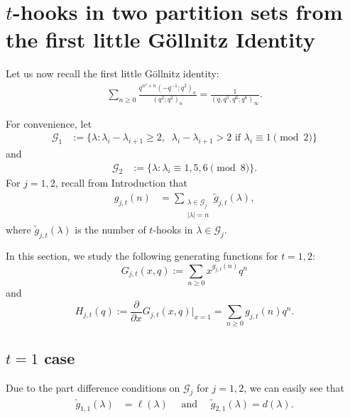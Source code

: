 \documentclass[11pt,reqno]{amsart}
\theoremstyle{remark}
\numberwithin{equation}{section}
\begin{document}
\section{$t$-hooks in two partition sets from the first little G\"{o}llnitz Identity}\label{sec5}

Let us now recall the first little G\"ollnitz identity:
\begin{align*}
	\sum_{n\ge 0} \frac{ q^{n^2+n} (-q^{-1};q^2)_n}{(q^2;q^2)_n} =\frac{1}{(q,q^5,q^6;q^{8})_{\infty}}.
\end{align*}   

For convenience, let
\begin{align*}
	\mathcal{G}_1&:=\{\lambda : \lambda_{i}-\lambda_{i+1} \ge 2, \;\; \lambda_{i}-\lambda_{i+1} >2 \text{ if $\lambda_i\equiv 1 \pmod{2}$}\}
\end{align*}
and
\begin{align*}
	\mathcal{G}_2&:=\{\lambda : \lambda_{i}\equiv 1, 5, 6 \pmod{8}\}.
\end{align*} 
For $j=1,2$, recall from Introduction that
\begin{align*}
	g_{j,t}(n)&=\sum\limits_{\substack{\lambda\in\mathcal{G}_j \\ |\lambda|=n}}\widetilde{g}_{j,t} (\lambda),
\end{align*}
where $\widetilde{g}_{j, t} (\lambda)$ is the number of $t$-hooks in $\lambda \in \mathcal{G}_j$. 

In this section, we study the following generating functions for $t=1,2$:
\begin{equation*}
	G_{j,t}(x,q):=\sum_{n\ge 0} x^{g_{j,t}(n)} q^{n}
\end{equation*}
and
\begin{equation*}
	H_{j,t}(q):=\frac{\partial}{\partial x} G_{j,t}(x,q) \bigg|_{x=1}=\sum_{n\ge 0} g_{j,t}(n) q^n. 
\end{equation*}


\subsection{$t=1$ case}\label{sec5.1}
Due to the part difference conditions on $\mathcal{G}_j$ for $j=1,2$, we can easily see that
\begin{align*}
	\widetilde{g}_{1,1} (\lambda)&=\ell(\lambda) %
    \quad \text{ and } \quad 
	\widetilde{g}_{2,1}  (\lambda)=d (\lambda).
\end{align*}
\end{document}
